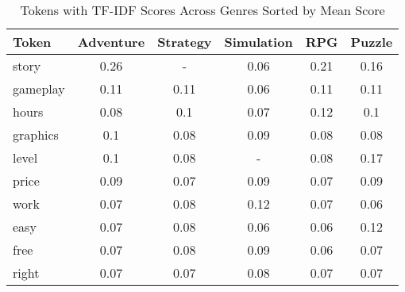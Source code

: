 \begin{table}[h]
    \centering
    \begin{tabular}{l|c|c|c|c|c}
        Token & Adventure & Strategy & Simulation & RPG & Puzzle \\
        \hline
        story & 0.26 & - & 0.06 & 0.21 & 0.16 \\
        gameplay & 0.11 & 0.11 & 0.06 & 0.11 & 0.11 \\
        hours & 0.08 & 0.1 & 0.07 & 0.12 & 0.1 \\
        graphics & 0.1 & 0.08 & 0.09 & 0.08 & 0.08 \\
        level & 0.1 & 0.08 & - & 0.08 & 0.17 \\
        price & 0.09 & 0.07 & 0.09 & 0.07 & 0.09 \\
        work & 0.07 & 0.08 & 0.12 & 0.07 & 0.06 \\
        easy & 0.07 & 0.08 & 0.06 & 0.06 & 0.12 \\
        free & 0.07 & 0.08 & 0.09 & 0.06 & 0.07 \\
        right & 0.07 & 0.07 & 0.08 & 0.07 & 0.07
    \end{tabular}
    \caption{Tokens with TF-IDF Scores Across Genres Sorted by Mean Score}
    \label{tab:prominent_tokens}
\end{table}